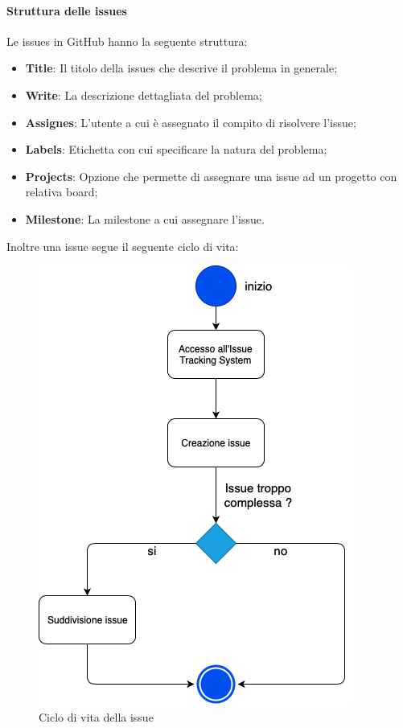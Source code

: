                     \clearpage
                    \paragraph{Struttura delle issues}
                        Le issues in GitHub hanno la seguente struttura:
                            \begin{itemize}
                                \item \textbf{Title}: Il titolo della issues che descrive il problema in generale;
                                \item \textbf{Write}: La descrizione dettagliata del problema;
                                \item \textbf{Assignes}: L'utente a cui è assegnato il compito di risolvere l'issue;
                                \item \textbf{Labels}: Etichetta con cui specificare la natura del problema;
                                \item \textbf{Projects}: Opzione che permette di assegnare una issue ad un progetto con relativa board;
                                \item \textbf{Milestone}: La milestone a cui assegnare l'issue. \newline
                            \end{itemize}
                            Inoltre una issue segue il seguente ciclo di vita:
                    	     \begin{figure}[!htbp]
                    	    	\centering
                    	    	\includegraphics[scale=0.5]{task.png}
                    	    	\caption{Ciclo di vita della issue}
                    	    \end{figure}
                    	    \clearpage
